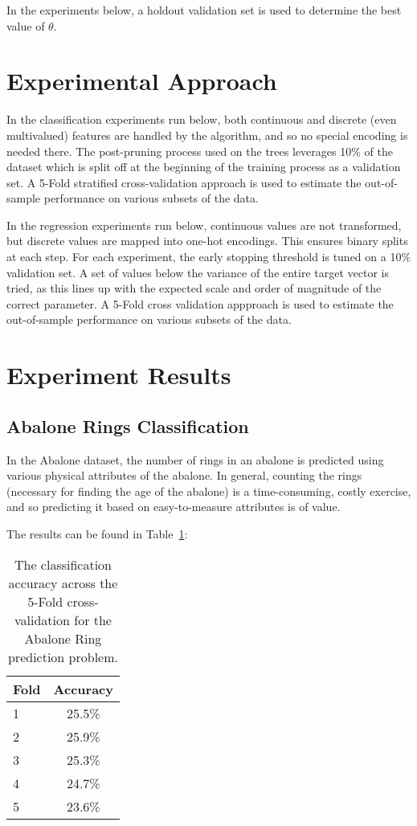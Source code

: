 \documentclass{amsart}
\begin{document}
    In the experiments below, a holdout validation set is used to determine
    the best value of $\theta$.

    \section{Experimental Approach}
    In the classification experiments run below, both continuous and discrete (even multivalued)
    features are handled by the algorithm, and so no special encoding is needed there.
    The post-pruning process used on the trees leverages 10\% of the dataset which is split
    off at the beginning of the training process as a validation set. A 5-Fold stratified
    cross-validation approach is used to estimate the out-of-sample performance on various
    subsets of the data.

    In the regression experiments run below, continuous values are not transformed, but
    discrete values are mapped into one-hot encodings. This ensures binary splits at each
    step. For each experiment, the early stopping threshold is tuned on a 10\% validation
    set. A set of values below the variance of the entire target vector is tried, as this
    lines up with the expected scale and order of magnitude of the correct parameter.
    A 5-Fold cross validation appproach is used to estimate the out-of-sample
    performance on various subsets of the data.

    \section{Experiment Results}
    \subsection{Abalone Rings Classification}
    In the Abalone dataset\cite{abalone_dataset}, the number of rings in an abalone
    is predicted using various physical attributes of the abalone. In general, counting
    the rings (necessary for finding the age of the abalone) is a time-consuming, costly
    exercise, and so predicting it based on easy-to-measure attributes is of value.

    The results can be found in Table~\ref{abalone_results}:

    \begin{table}[H]
    \begin{tabular}{lc}
        Fold & Accuracy \\
        \hline
        1 & 25.5\% \\
        2 & 25.9\% \\
        3 & 25.3\% \\
        4 & 24.7\% \\
        5 & 23.6\%
    \end{tabular}
    \label{abalone_results}
    \caption{The classification accuracy across the 5-Fold cross-validation for the
    Abalone Ring prediction problem.}
    \end{table}
\end{document}
